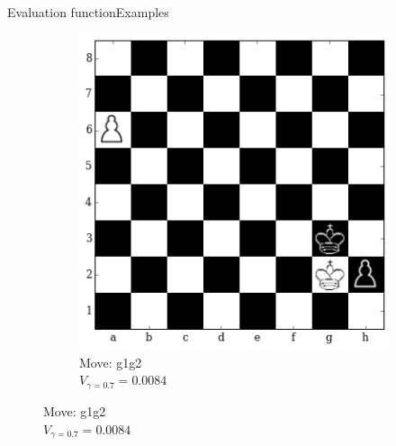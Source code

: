 \documentclass[9pt, unknownkeysallowed]{beamer}
\begin{document}
\begin{frame}{Evaluation function}{Examples}
{\begin{figure}[H]
\begin{subfigure}[t]{0.3\textwidth}
    \includegraphics[width=\textwidth]{../img/table_evaluations/output_15_4.png}
        \caption{Move: g1g2 \\
        $V_{\gamma=0.7}=0.0084$}
    \end{subfigure}
\end{figure}
}
\end{frame}
\end{document}
